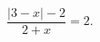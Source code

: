 \begin{ex}[type=equation]
	\begin{condition}
		$\dfrac{\big|3  - x\big| - 2}{2 + x}= 2.$
	\end{condition}
\end{ex}